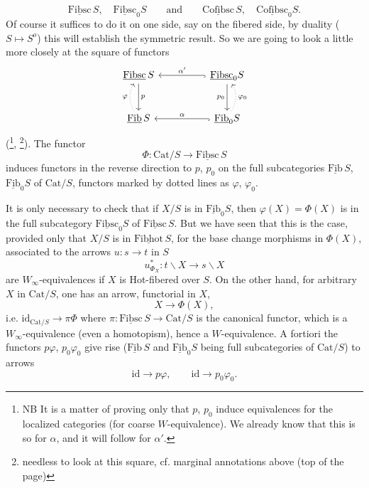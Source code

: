 \documentclass[11pt]{article}
\newcommand{\msp}[1]{\marginpar{\footnotesize [#1]}}
\newcommand{\uc}[1]{\underline{\mathrm{#1}}}
\newcommand{\Cat}{\mathrm{Cat}}
\begin{document}
\[
\uc{Fibsc}\,S,\quad \uc{Fibsc}_0S \qquad \text{and} \qquad \uc{Cofibsc}\,S,\quad \uc{Cofibsc}_0S.
\]
Of course it suffices to do it on one side, say on the fibered side, by duality ($S \longmapsto S^o$) this will establish the symmetric result. So we are going to look a little more closely at the square of functors
\[
\begin{tikzcd}[column sep=huge, row sep=large]
\uc{Fibsc}\,S \arrow[d, "p"] & \uc{Fibsc}_0S \arrow[l, hook, "\alpha'"'] \arrow[d, "p_0"'] \\
\uc{Fib}\,S \arrow[u, dotted, bend left, "\varphi"] & \uc{Fib}_0S \arrow[l, hook, "\alpha"'] \arrow[u, dotted, bend right, "\varphi_0"']
\end{tikzcd}
\]
(\footnote[37]{NB It is a matter of proving only that $p$, $p_0$ induce equivalences for the localized categories (for coarse $W$-equivalence). We already know that this is so for $\alpha$, and it will follow for $\alpha'$.}, \footnote[38]{needless to look at this square, cf. marginal annotations above (top of the page)}). The functor
\[
\Phi : \Cat/S \longrightarrow \uc{Fibsc}\,S
\]
induces functors in the reverse direction to $p$, $p_0$ on the full subcategories $\uc{Fib}\,S$, $\uc{Fib}_0S$ of $\Cat/S$, functors marked by dotted lines as $\varphi$, $\varphi_0$.

\msp{page 54}

It is only necessary to check that if $X/S$ is in $\uc{Fib}_0S$, then $\varphi(X) = \Phi(X)$ is in the full subcategory $\uc{Fibsc}_0S$ of $\uc{Fibsc}\,S$. But we have seen that this is the case, provided only that $X/S$ is in $\uc{Fibhot}\,S$, for the base change morphisms in $\Phi(X)$, associated to the arrows $u : s \longrightarrow t$ in $S$
\[
u^*_{\Phi_X} : t\backslash X \longrightarrow s\backslash X
\]
are $W_\infty$-equivalences if $X$ is Hot-fibered over $S$. On the other hand, for arbitrary $X$ in $\Cat/S$, one has an arrow, functorial in $X$,
\[
X \longrightarrow \Phi(X),
\]
i.e. $\mathrm{id}_{\Cat/S} \longrightarrow \pi\Phi$ where $\pi : \uc{Fibsc}\,S \longrightarrow \Cat/S$ is the canonical functor, which is a $W_\infty$-equivalence (even a homotopism), hence a $W$-equivalence. A fortiori the functors $p\varphi$, $p_0\varphi_0$ give rise ($\uc{Fib}\,S$ and $\uc{Fib}_0S$ being full subcategories of $\Cat/S$) to arrows
\[
\mathrm{id} \longrightarrow p\varphi, \qquad \mathrm{id} \longrightarrow p_0\varphi_0.
\]
\end{document}
